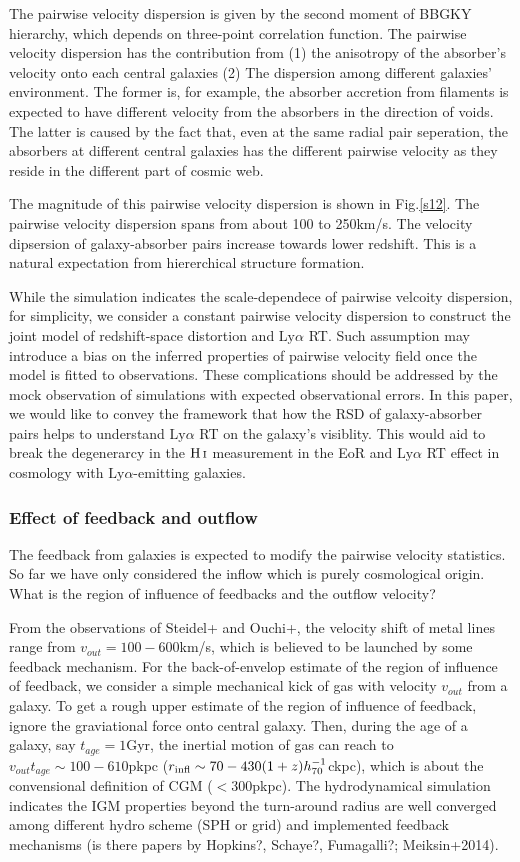 \documentclass[useAMS,usenatbib,twocolumn]{mn2e}
\newcommand{\HI}{{\rm H\,{\scriptstyle I}}}
\newcommand{\LyA}{\mbox{Ly}\alpha}
\begin{document}
The pairwise velocity dispersion is given by the second moment of 
BBGKY hierarchy, which depends on three-point correlation function.
The pairwise velocity dispersion has the contribution from (1)
the anisotropy of the absorber's velocity onto each central galaxies
(2) The dispersion among different galaxies' environment.
The former is, for example, the absorber accretion from filaments
is expected to have different velocity from the absorbers in
the direction of voids. The latter is caused by the fact that, 
even at the same radial pair seperation, the absorbers at different
central galaxies has the different pairwise velocity as they 
reside in the different part of cosmic web. 

The magnitude of this pairwise velocity dispersion is shown in Fig.\ref{s12}.
The pairwise velocity dispersion spans from about 100 to 250km/s.
The velocity dipsersion of galaxy-absorber pairs increase towards lower
redshift. This is a natural expectation from hiererchical structure formation.

While the simulation indicates the scale-dependece of pairwise velcoity
dispersion, for simplicity, we consider a constant pairwise velocity dispersion
to construct the joint model of redshift-space distortion and $\LyA$ RT.
Such assumption may introduce a bias on the inferred properties of
pairwise velocity field once the model is fitted to observations. 
These complications should be addressed by the mock observation
of simulations with expected observational errors. In this paper, we would
like to convey the framework that how the RSD of galaxy-absorber pairs
helps to understand $\LyA$ RT on the galaxy's visiblity. This would
aid to break the degenerarcy in the $\HI$ measurement in the EoR and 
$\LyA$ RT effect in cosmology with $\LyA$-emitting galaxies.

\subsubsection{Effect of feedback and outflow}
The feedback from galaxies is expected to modify the pairwise velocity
statistics. So far we have only considered the inflow which is purely
cosmological origin. What is the region of influence of feedbacks and
the outflow velocity?

From the observations of Steidel+ and Ouchi+, the velocity shift of
metal lines range from $v_{out}=100-600$km/s, which is believed to
be launched by some feedback mechanism. For the back-of-envelop
estimate of the region of influence of feedback, we consider a simple
mechanical kick of gas with velocity $v_{out}$ from a galaxy. To get
a rough upper estimate of the region of influence of feedback, ignore
the graviational force onto central galaxy. Then, during the age of 
a galaxy, say $t_{age}=1$Gyr, the inertial motion of gas can reach to
$v_{out}t_{age}\sim100-610$pkpc ($r_{\rm{infl}}\sim70-430(1+z)h_{70}^{-1}$ckpc), 
which is about the convensional definition of CGM ($<$300pkpc). 
The hydrodynamical simulation indicates the IGM properties beyond the
turn-around radius are well converged among different hydro scheme (SPH or
grid) and implemented feedback mechanisms (is there papers by Hopkins?, Schaye?,
Fumagalli?; Meiksin+2014).
\end{document}

